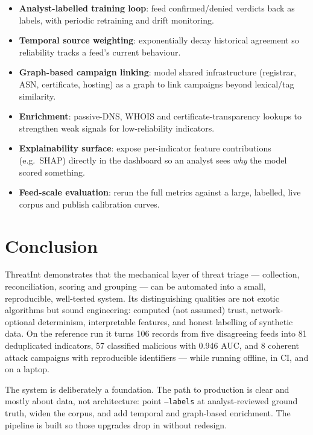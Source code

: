 \documentclass[11pt,a4paper]{article}
\newcommand{\code}[1]{\texttt{\small #1}}
\begin{document}
\begin{itemize}[leftmargin=1.4em,itemsep=3pt]
  \item \textbf{Analyst-labelled training loop}: feed confirmed/denied verdicts
    back as labels, with periodic retraining and drift monitoring.
  \item \textbf{Temporal source weighting}: exponentially decay historical
    agreement so reliability tracks a feed's current behaviour.
  \item \textbf{Graph-based campaign linking}: model shared infrastructure
    (registrar, ASN, certificate, hosting) as a graph to link campaigns beyond
    lexical/tag similarity.
  \item \textbf{Enrichment}: passive-DNS, WHOIS and certificate-transparency
    lookups to strengthen weak signals for low-reliability indicators.
  \item \textbf{Explainability surface}: expose per-indicator feature
    contributions (e.g.\ SHAP) directly in the dashboard so an analyst sees
    \emph{why} the model scored something.
  \item \textbf{Feed-scale evaluation}: rerun the full metrics against a large,
    labelled, live corpus and publish calibration curves.
\end{itemize}

\section{Conclusion}

ThreatInt demonstrates that the mechanical layer of threat triage ---
collection, reconciliation, scoring and grouping --- can be automated into a
small, reproducible, well-tested system. Its distinguishing qualities are not
exotic algorithms but sound engineering: computed (not assumed) trust,
network-optional determinism, interpretable features, and honest labelling of
synthetic data. On the reference run it turns 106 records from five disagreeing
feeds into 81 deduplicated indicators, 57 classified malicious with 0.946 AUC,
and 8 coherent attack campaigns with reproducible identifiers --- while running
offline, in CI, and on a laptop.

The system is deliberately a foundation. The path to production is clear and
mostly about data, not architecture: point \code{--labels} at analyst-reviewed
ground truth, widen the corpus, and add temporal and graph-based enrichment.
The pipeline is built so those upgrades drop in without redesign.
\end{document}
